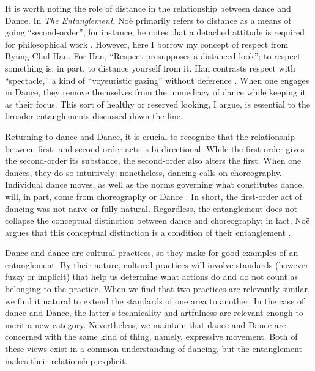 \documentclass[12pt,letterpaper]{article}
\begin{document}
It is worth noting the role of distance in the relationship between dance and
Dance. In \textit{The Entanglement}, Noë primarily refers to distance as a means
of going ``second-order''; for instance, he notes that a detached attitude is
required for philosophical work \autocite[188--189]{noeEntanglement2023}.
However, here I borrow my concept of respect from Byung-Chul Han. For Han,
``Respect presupposes a distanced look''; to respect something is, in part, to
distance yourself from it. Han contrasts respect with ``spectacle,'' a kind of
``voyeuristic gazing'' without deference \autocite[1]{hanSwarm2017}. When one
engages in Dance, they remove themselves from the immediacy of dance while
keeping it as their focus. This sort of healthy or reserved looking, I argue, is
essential to the broader entanglements discussed down the line.

Returning to dance and Dance, it is crucial to recognize that the relationship
between first- and second-order acts is bi-directional. While the first-order
gives the second-order its substance, the second-order also alters the first.
When one dances, they do so intuitively; nonetheless, dancing calls on
choreography. Individual dance moves, as well as the norms governing what
constitutes dance, will, in part, come from choreography or Dance
\autocite[30]{noeEntanglement2023}. In short, the first-order act of dancing was
not naïve or fully natural. Regardless, the entanglement does not collapse the
conceptual distinction between dance and choreography; in fact, Noë argues that
this conceptual distinction is a condition of their entanglement
\autocite[31]{noeEntanglement2023}.

Dance and dance are cultural practices, so they make for good examples of an
entanglement. By their nature, cultural practices will involve standards
(however fuzzy or implicit) that help us determine what actions do and do not
count as belonging to the practice. When we find that two practices are
relevantly similar, we find it natural to extend the standards of one area to
another. In the case of dance and Dance, the latter's technicality and
artfulness are relevant enough to merit a new category. Nevertheless, we
maintain that dance and Dance are concerned with the same kind of thing, namely,
expressive movement. Both of these views exist in a common understanding of
dancing, but the entanglement makes their relationship explicit.
\end{document}
